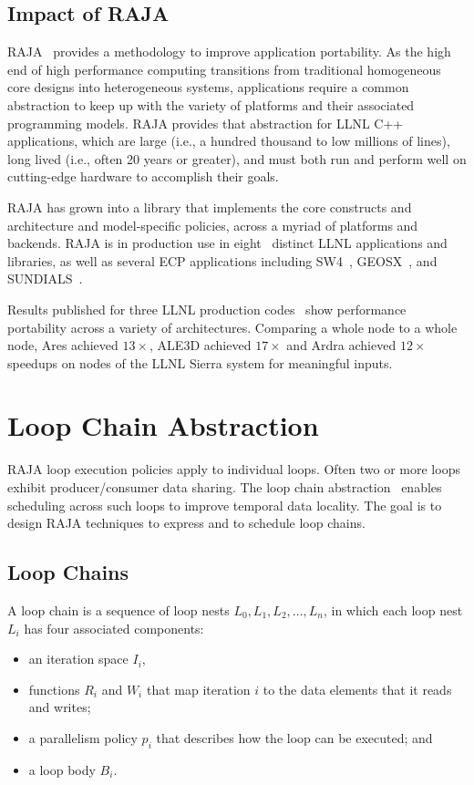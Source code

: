 \subsection{Impact of RAJA}

RAJA~\cite{RAJA} provides a methodology to improve application portability.
As the high end of high performance computing transitions from traditional
homogeneous core designs into heterogeneous systems, applications 
require a common abstraction to keep up with the variety of platforms
and their associated programming models.
RAJA provides that abstraction for LLNL C++ applications, which are large
(i.e., a hundred thousand to low millions of lines), long lived (i.e., often
20 years or greater), and must both run and perform well on cutting-edge
hardware to accomplish their goals.

RAJA has grown into a library that implements the core constructs and
architecture and model-specific policies, across a myriad of platforms and
backends. RAJA is in production use in eight~\cite{raja-ecp-report} distinct
LLNL applications and libraries, as well as several ECP applications including
SW4~\cite{sw4}, GEOSX~\cite{geosx}, and SUNDIALS~\cite{sundials}.

Results published for three LLNL production codes~\cite{raja-p3hpc} show
performance portability across a variety of architectures.  Comparing a whole
node to a whole node, Ares achieved $13\times$, ALE3D achieved $17\times$ and
Ardra achieved $12\times$ speedups on nodes of the LLNL Sierra system for
meaningful inputs.


\section{Loop Chain Abstraction}
\label{sec:loopchain}
RAJA loop execution policies apply to individual loops.
Often two or more loops exhibit producer/consumer data sharing.
The loop chain abstraction~\cite{krieger2013loop} enables scheduling
across such loops to improve temporal data locality. 
The goal is to design RAJA techniques to express and to schedule loop chains.

\subsection{Loop Chains}

A loop chain is a sequence of loop nests $L_{0},L_{1},L_{2},\dots,L_{n}$,
in which each loop nest $L_{i}$ has four associated components:
\begin{itemize}
\item an iteration space $I_{i}$,
\item functions $R_{i}$ and $W_{i}$ that map iteration $i$ to the data 
      elements that it reads and writes;
\item a parallelism policy $p_{i}$ that describes how the loop can be executed; and
\item a loop body $B_{i}$.
\end{itemize} 

